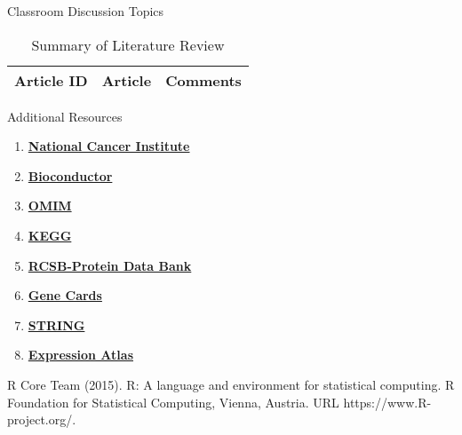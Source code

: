 \begin{frame}[t]
\begin{columns}[t]
\begin{column}{\onecolwid}
\begin{alertblock}{Classroom Discussion Topics}

\begin{table}[H]
	\centering
	\begin{tabular}{r|p{12cm}|l}
	\hline
	Article ID  & Article & Comments \\
	\hline
	\hline
	\end{tabular}
	\caption{Summary of Literature Review}
\end{table} 

\end{alertblock}
\begin{alertblock}{Additional Resources}
\begin{enumerate}
	\item \href{http://www.cancer.gov}{\textbf{National Cancer Institute}}
	\item \href{http://www.bioconductor.org}{\textbf{Bioconductor}}
	\item \href{http://www.omim.org}{\textbf{OMIM}}
	\item \href{http://www.genome.jp/kegg/}{\textbf{KEGG}}
	\item \href{http://www.rcsb.org}{\textbf{RCSB-Protein Data Bank}}
	\item \href{http://www.genecards.org}{\textbf{Gene Cards}}
	\item \href{http://string-db.org}{\textbf{STRING}}
	\item \href{http://www.ebi.ac.uk/gxa/home}{\textbf{Expression Atlas}}
\end{enumerate}
\end{alertblock}

\begin{thebibliography}{00}
\footnotesize		 		
{}R Core Team (2015). 
\newblock R: A language and environment for statistical computing. R Foundation for Statistical Computing, Vienna, Austria.
\newblock URL https://www.R-project.org/.		
\end{thebibliography}
\end{column}
\end{columns}
\end{frame}

